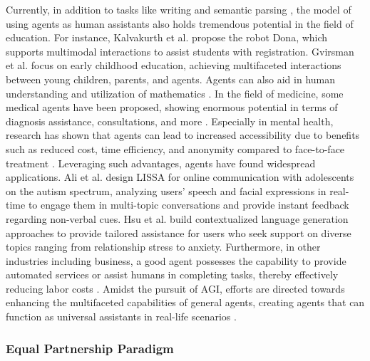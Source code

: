 Currently, in addition to tasks like writing \cite{DBLP:journals/corr/abs-2204-03685} and semantic parsing \cite{DBLP:conf/acl/IyerKCKZ17, DBLP:conf/naacl/ElgoharyMRFRA21}, the model of using agents as human assistants also holds tremendous potential in the field of education. For instance, Kalvakurth et al. \cite{DBLP:journals/corr/abs-2303-13548} propose the robot Dona, which supports multimodal interactions to assist students with registration. Gvirsman et al. \cite{DBLP:conf/hri/GvirsmanKNG20} focus on early childhood education, achieving multifaceted interactions between young children, parents, and agents. Agents can also aid in human understanding and utilization of mathematics \cite{DBLP:journals/corr/abs-2307-02502}. 
In the field of medicine, some medical agents have been proposed, showing enormous potential in terms of diagnosis assistance, consultations, and more \cite{DBLP:journals/corr/abs-2305-15075,DBLP:journals/corr/abs-2308-03549}. 
Especially in mental health, research has shown that agents can lead to increased accessibility due to benefits such as reduced cost, time efficiency, and anonymity compared to face-to-face treatment \cite{doi:10.1177/2055207617713827}. 
Leveraging such advantages, agents have found widespread applications. Ali et al. \cite{DBLP:conf/iva/AliRLMKRSH20} design LISSA for online communication with adolescents on the autism spectrum, analyzing users' speech and facial expressions in real-time to engage them in multi-topic conversations and provide instant feedback regarding non-verbal cues. Hsu et al. \cite{hsu2023helping} build contextualized language generation approaches to provide tailored assistance for users who seek support on diverse topics ranging from relationship stress to anxiety. 
Furthermore, in other industries including business, a good agent possesses the capability to provide automated services or assist humans in completing tasks, thereby effectively reducing labor costs \cite{DBLP:conf/ijcnn/GaoGT23}. 
Amidst the pursuit of AGI, efforts are directed towards enhancing the multifaceted capabilities of general agents, creating agents that can function as universal assistants in real-life scenarios \cite{DBLP:journals/corr/abs-2306-08640}.

\subsubsection{Equal Partnership Paradigm} \label{Equal Partnership Paradigm}
